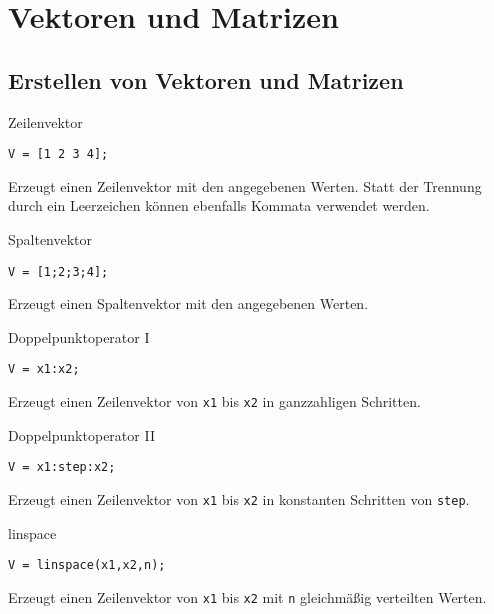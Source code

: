 \section{Vektoren und Matrizen}
        \subsection{Erstellen von Vektoren und Matrizen}
        \begin{CodeErklaerungBox}{Zeilenvektor}
                \begin{lstlisting}
V = [1 2 3 4];
                \end{lstlisting}
                \tcblower
                Erzeugt einen Zeilenvektor mit den angegebenen Werten. Statt der Trennung durch ein Leerzeichen können ebenfalls Kommata verwendet werden.
                \end{CodeErklaerungBox}
                \begin{CodeErklaerungBox}{Spaltenvektor}
                \begin{lstlisting}
V = [1;2;3;4];
                \end{lstlisting}
                \tcblower
                Erzeugt einen Spaltenvektor mit den angegebenen Werten.
            \end{CodeErklaerungBox}
            \begin{CodeErklaerungBox}{Doppelpunktoperator I}
                \begin{lstlisting}
V = x1:x2;
                \end{lstlisting}
                \tcblower
                Erzeugt einen Zeilenvektor von \texttt{x1} bis \texttt{x2} in ganzzahligen Schritten.
            \end{CodeErklaerungBox}
            \begin{CodeErklaerungBox}{Doppelpunktoperator II}
                \begin{lstlisting}
V = x1:step:x2;
                \end{lstlisting}
                \tcblower
                Erzeugt einen Zeilenvektor von \texttt{x1} bis \texttt{x2} in konstanten Schritten von \texttt{step}.
            \end{CodeErklaerungBox}
            \begin{CodeErklaerungBox}{linspace}
                \begin{lstlisting}
V = linspace(x1,x2,n);
                \end{lstlisting}
                \tcblower
                Erzeugt einen Zeilenvektor von \texttt{x1} bis \texttt{x2} mit \texttt{n} gleichmäßig verteilten Werten.
            \end{CodeErklaerungBox}

